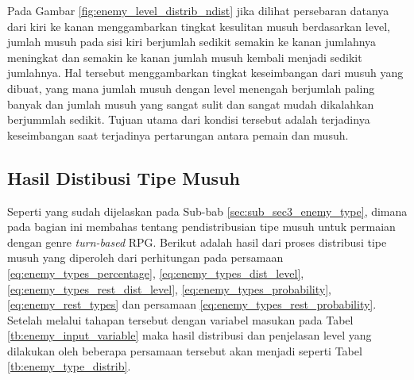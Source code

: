 Pada Gambar \ref{fig:enemy_level_distrib_ndist} jika dilihat persebaran datanya dari kiri ke kanan menggambarkan tingkat kesulitan musuh berdasarkan level, jumlah musuh pada sisi kiri berjumlah sedikit semakin ke kanan jumlahnya meningkat dan semakin ke kanan jumlah musuh kembali menjadi sedikit jumlahnya. Hal tersebut menggambarkan tingkat keseimbangan dari musuh yang dibuat, yang mana jumlah musuh dengan level menengah berjumlah paling banyak dan jumlah musuh yang sangat sulit dan sangat mudah dikalahkan berjummlah sedikit. Tujuan utama dari kondisi tersebut adalah terjadinya keseimbangan saat terjadinya pertarungan antara pemain dan musuh.
\vspace{1ex}


\subsection{Hasil Distibusi Tipe Musuh}
\label{sec:sub_sec4_eval_dist_enemy_type}
\vspace{1ex}

Seperti yang sudah dijelaskan pada Sub-bab \ref{sec:sub_sec3_enemy_type}, dimana pada bagian ini membahas tentang pendistribusian tipe musuh untuk permaian dengan genre \textit{turn-based} RPG. Berikut adalah hasil dari proses distribusi tipe musuh yang diperoleh dari perhitungan pada persamaan \ref{eq:enemy_types_percentage}, \ref{eq:enemy_types_dist_level}, \ref{eq:enemy_types_rest_dist_level}, \ref{eq:enemy_types_probability}, \ref{eq:enemy_rest_types} dan persamaan \ref{eq:enemy_types_rest_probability}. Setelah melalui tahapan tersebut dengan variabel masukan pada Tabel \ref{tb:enemy_input_variable} maka hasil distribusi dan penjelasan level yang dilakukan oleh beberapa persamaan tersebut akan menjadi seperti Tabel \ref{tb:enemy_type_distrib}.

